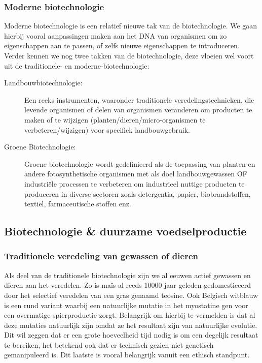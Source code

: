 \documentclass[a4paper,kul]{kulakarticle} %
\begin{document}
\subsubsection{Moderne biotechnologie}
Moderne biotechnologie is een relatief nieuwe tak van de biotechnologie. We gaan hierbij vooral aanpassingen maken aan het DNA van organismen om zo eigenschappen aan te passen, of zelfs nieuwe eigenschappen te introduceren. 
\newpage
\noindent
Verder kennen we nog twee takken van de biotechnologie, deze vloeien wel voort uit de traditionele- en moderne-biotechnologie:
\begin{description}
	\item[Landbouwbiotechnologie:] Een reeks instrumenten, waaronder traditionele veredelingstechnieken,
	die levende organismen of delen van organismen veranderen om
	producten te maken of te wijzigen (planten/dieren/micro-organismen te
	verbeteren/wijzigen) voor specifiek landbouwgebruik.
	\item[Groene Biotechnologie:] Groene biotechnologie wordt gedefinieerd als de
	toepassing van planten en andere fotosynthetische
	organismen met als doel landbouwgewassen OF
	industriële processen te verbeteren om industrieel nuttige producten te
	produceren in diverse sectoren zoals detergentia, papier,
	biobrandstoffen, textiel, farmaceutische stoffen enz.
\end{description}
\subsection{Biotechnologie \& duurzame voedselproductie}
\subsubsection{Traditionele veredeling van gewassen of dieren}
Als deel van de traditionele biotechnologie zijn we al eeuwen actief gewassen en dieren aan het veredelen. Zo is maïs al reeds \num{10000} jaar geleden gedomesticeerd door het selectief veredelen van een gras genaamd teosine. Ook Belgisch witblauw is een rund variant waarbij een natuurlijke mutatie in het myostatine gen voor een overmatige spierproductie zorgt. Belangrijk om hierbij te vermelden is dat al deze mutaties natuurlijk zijn omdat ze het resultaat zijn van natuurlijke evolutie. Dit wil zeggen dat er een grote hoeveelheid tijd nodig is om een degelijk resultaat te bereiken, het betekend ook dat er technisch gezien niet genetisch gemanipuleerd is. Dit laatste is vooral belangrijk vanuit een ethisch standpunt. 
\end{document}
